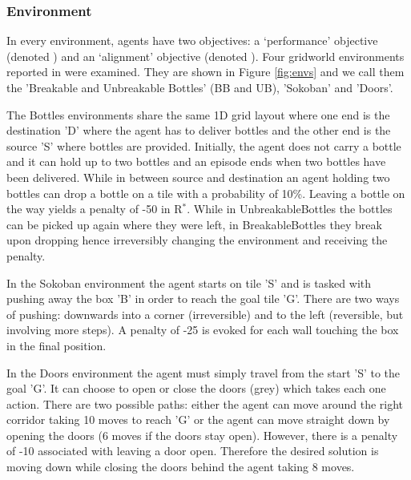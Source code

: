 \subsubsection{Environment}

In every environment, agents have two objectives: a `performance' objective (denoted \RP{}) and an `alignment' objective (denoted \RA{}). %
Four gridworld environments reported in \cite{vamplew_potential-based_2021} were examined.
They are shown in Figure \ref{fig:envs} and we call them the 'Breakable and Unbreakable Bottles' (BB and UB), 'Sokoban' and 'Doors'.

The Bottles environments share the same 1D grid layout where one end is the destination 'D' where the agent has to deliver bottles and the other end is the source 'S' where bottles are provided.
Initially, the agent does not carry a bottle and it can hold up to two bottles and an episode ends when two bottles have been delivered.
While in between source and destination an agent holding two bottles can drop a bottle on a tile with a probability of 10\%.
Leaving a bottle on the way yields a penalty of -50 in R$^*$.
While in UnbreakableBottles the bottles can be picked up again where they were left, in BreakableBottles they break upon dropping hence irreversibly changing the environment and receiving the penalty.

In the Sokoban environment the agent starts on tile 'S' and is tasked with pushing away the box 'B' in order to reach the goal tile 'G'.
There are two ways of pushing: downwards into a corner (irreversible) and to the left (reversible, but involving more steps).
A penalty of -25 is evoked for each wall touching the box in the final position.

In the Doors environment the agent must simply travel from the start 'S' to the goal 'G'.
It can choose to open or close the doors (grey) which takes each one action. 
There are two possible paths: either the agent can move around the right corridor taking 10 moves to reach 'G' or the agent can move straight down by opening the doors (6 moves if the doors stay open).
However, there is a penalty of -10 associated with leaving a door open.
Therefore the desired solution is moving down while closing the doors behind the agent taking 8 moves.

